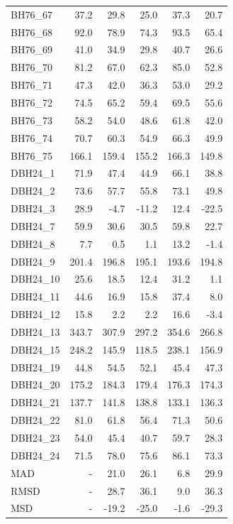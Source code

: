 \begin{longtable}{lrrrrr}
BH76\_67 & 37.2 & 29.8 & 25.0 & 37.3 & 20.7 \\
BH76\_68 & 92.0 & 78.9 & 74.3 & 93.5 & 65.4 \\
BH76\_69 & 41.0 & 34.9 & 29.8 & 40.7 & 26.6 \\
BH76\_70 & 81.2 & 67.0 & 62.3 & 85.0 & 52.8 \\
BH76\_71 & 47.3 & 42.0 & 36.3 & 53.0 & 29.2 \\
BH76\_72 & 74.5 & 65.2 & 59.4 & 69.5 & 55.6 \\
BH76\_73 & 58.2 & 54.0 & 48.6 & 61.8 & 42.0 \\
BH76\_74 & 70.7 & 60.3 & 54.9 & 66.3 & 49.9 \\
BH76\_75 & 166.1 & 159.4 & 155.2 & 166.3 & 149.8 \\
DBH24\_1 & 71.9 & 47.4 & 44.9 & 66.1 & 38.8 \\
DBH24\_2 & 73.6 & 57.7 & 55.8 & 73.1 & 49.8 \\
DBH24\_3 & 28.9 & -4.7 & -11.2 & 12.4 & -22.5 \\
DBH24\_7 & 59.9 & 30.6 & 30.5 & 59.8 & 22.7 \\
DBH24\_8 & 7.7 & 0.5 & 1.1 & 13.2 & -1.4 \\
DBH24\_9 & 201.4 & 196.8 & 195.1 & 193.6 & 194.8 \\
DBH24\_10 & 25.6 & 18.5 & 12.4 & 31.2 & 1.1 \\
DBH24\_11 & 44.6 & 16.9 & 15.8 & 37.4 & 8.0 \\
DBH24\_12 & 15.8 & 2.2 & 2.2 & 16.6 & -3.4 \\
DBH24\_13 & 343.7 & 307.9 & 297.2 & 354.6 & 266.8 \\
DBH24\_15 & 248.2 & 145.9 & 118.5 & 238.1 & 156.9 \\
DBH24\_19 & 44.8 & 54.5 & 52.1 & 45.4 & 47.3 \\
DBH24\_20 & 175.2 & 184.3 & 179.4 & 176.3 & 174.3 \\
DBH24\_21 & 137.7 & 141.8 & 138.8 & 133.1 & 136.3 \\
DBH24\_22 & 81.0 & 61.8 & 56.4 & 71.3 & 50.6 \\
DBH24\_23 & 54.0 & 45.4 & 40.7 & 59.7 & 28.3 \\
DBH24\_24 & 71.5 & 78.0 & 75.6 & 86.1 & 73.3 \\
MAD & - & 21.0 & 26.1 & 6.8 & 29.9 \\
RMSD & - & 28.7 & 36.1 & 9.0 & 36.3 \\
MSD & - & -19.2 & -25.0 & -1.6 & -29.3 \\
\bottomrule
\end{longtable}